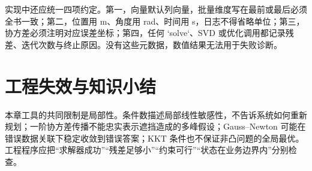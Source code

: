 实现中还应统一四项约定。第一，向量默认列向量，批量维度写在最前或最后必须全书一致；第二，位置用 m、角度用 rad、时间用 s，日志不得省略单位；第三，协方差必须注明对应误差坐标；第四，任何 `solve`、SVD 或优化调用都记录残差、迭代次数与终止原因。没有这些元数据，数值结果无法用于失败诊断。

\section{工程失效与知识小结}

本章工具的共同限制是局部性。条件数描述局部线性敏感性，不告诉系统如何重新规划；一阶协方差传播不能忠实表示遮挡造成的多峰假设；Gauss--Newton 可能在错误数据关联下稳定收敛到错误答案；KKT 条件也不保证非凸问题的全局最优。工程程序应把“求解器成功”“残差足够小”“约束可行”“状态在业务边界内”分别检查。

